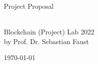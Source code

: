 \begin {center}

\vspace{1 in}

{\Huge Project Proposal}

\vspace {2 in}

{\Huge \textbf{\thetitle}} \\ 
\vspace{1 in}
{\Huge Blockchain (Project) Lab 2022} \\
{\huge by Prof. Dr. Sebastian Faust} \\

\vspace{0.5 in}

{\Large \today}

\vspace{1,5 in}

{\Large \textit \theauthor} 
\end {center}
